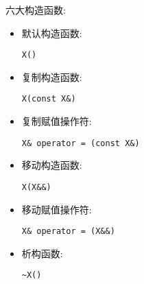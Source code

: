 六大构造函数:

\begin{itemize}
\item 
默认构造函数: 
\begin{lstlisting}[style=styleCXX]
X()
\end{lstlisting}

\item 
复制构造函数:
\begin{lstlisting}[style=styleCXX]
 X(const X&)
\end{lstlisting}

\item 
复制赋值操作符: 
\begin{lstlisting}[style=styleCXX]
X& operator = (const X&)
\end{lstlisting}

\item 
移动构造函数: 
\begin{lstlisting}[style=styleCXX]
X(X&&)
\end{lstlisting}

\item 
移动赋值操作符: 
\begin{lstlisting}[style=styleCXX]
X& operator = (X&&)
\end{lstlisting}

\item 
析构函数: 
\begin{lstlisting}[style=styleCXX]
~X()
\end{lstlisting}
\end{itemize}
